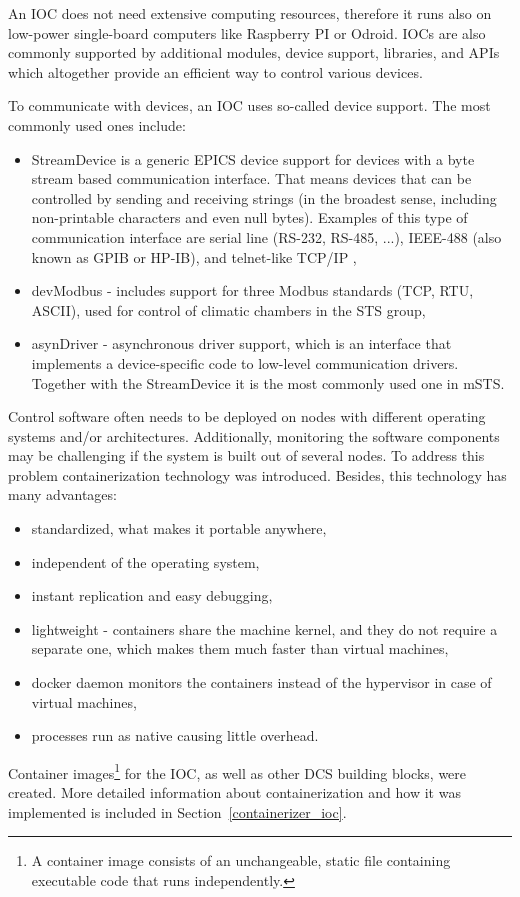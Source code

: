 An \gls{IOC} does not need extensive computing resources, therefore it runs also on low-power single-board computers like Raspberry PI or Odroid. 
 \glspl{IOC} are also commonly supported by additional modules, device support, libraries, and \glspl{API} which altogether provide an efficient way to control various devices.

 
To communicate with devices, an \gls{IOC} uses so-called device support. The most commonly used ones include:
\begin{itemize}
    \item StreamDevice is a generic EPICS device support for devices with a byte stream based communication interface. That means devices that can be controlled by sending and receiving strings (in the broadest sense, including non-printable characters and even null bytes). Examples of this type of communication interface are serial line (RS-232, RS-485, ...), IEEE-488 (also known as GPIB or HP-IB), and telnet-like TCP/IP \cite{StreamDevice},
    \item devModbus \cite{modbus} - includes support for three Modbus standards (TCP, RTU, ASCII), used for control of climatic chambers in the \gls{STS} group,
    \item asynDriver \cite{asyn} - asynchronous driver support, which is an interface that implements a device-specific code to low-level communication drivers. Together with the StreamDevice it is the most commonly used one in \gls{mSTS}. 
\end{itemize}

Control software often needs to be deployed on nodes with different operating systems and/or architectures. Additionally, monitoring the software components may be challenging if the system is built out of several nodes. To address this problem containerization technology was introduced. Besides, this technology has many advantages:
\begin{itemize}
    \item standardized, what makes it portable anywhere,
    \item independent of the operating system,
    \item instant replication and easy debugging,
    \item lightweight - containers share the machine kernel, and they do not require a separate one, which makes them much faster than virtual machines,
    \item docker daemon monitors the containers instead of the hypervisor in case of virtual machines,
    \item processes run as native causing little overhead.
\end{itemize}

Container images\footnote{A container image consists of an unchangeable, static file containing executable code that runs independently.} for the \gls{IOC}, as well as other \gls{DCS} building blocks, were created. More detailed information about containerization and how it was implemented is included in Section~\ref{containerizer_ioc}.
 
